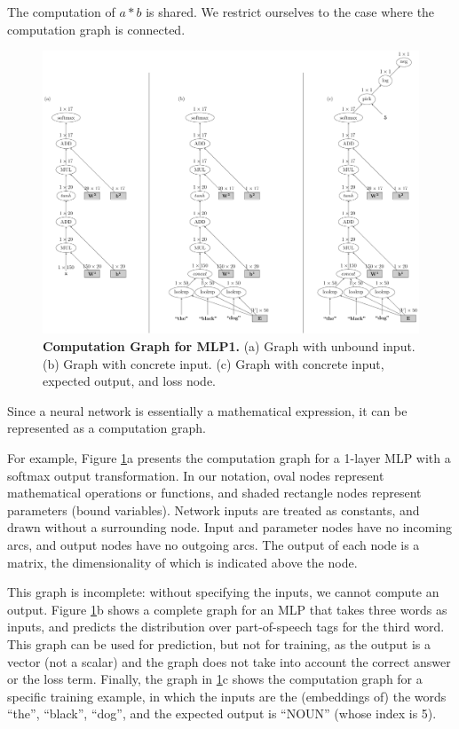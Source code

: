 \documentclass[jair,twoside,11pt,theapa]{article}
\begin{document}
{\noindent The computation of $a*b$ is shared.
We restrict ourselves to the case where the computation graph is
connected.

\begin{figure}[ht]
\includegraphics[width=\textwidth]{cg-composed.pdf}
\caption{\textbf{Computation Graph for MLP1.} (a) Graph with unbound input. (b) Graph with concrete input. (c) Graph with concrete input, expected output, and loss node.}
\label{fig:mlp-cg}
\end{figure}

Since a neural network is essentially a mathematical expression, it can be
represented as a computation graph.

For example, Figure \ref{fig:mlp-cg}a presents the computation graph for a 1-layer MLP with a softmax output transformation.
In our notation, oval nodes represent mathematical operations or functions, and shaded rectangle nodes
represent parameters (bound variables). Network inputs are treated as constants, and drawn without a surrounding node.
Input and parameter nodes have no incoming arcs, and output nodes
have no outgoing arcs.
The output of each node is a matrix, the dimensionality of which is indicated
above the node.

This graph is incomplete: without specifying the inputs, we cannot compute an
output. Figure \ref{fig:mlp-cg}b shows a complete graph for an MLP that takes
three words as inputs, and predicts the distribution over part-of-speech tags
for the third word.  This graph can be used for prediction, but not for
training, as the output is a vector (not a scalar) and the graph does not take
into account the correct answer or the loss term. Finally, the graph in
\ref{fig:mlp-cg}c shows the computation graph for a specific training example,
in which the inputs are the (embeddings of) the words ``the'', ``black'',
``dog'', and the expected output is ``NOUN'' (whose index is 5).

}
\end{document}
